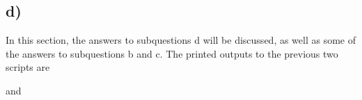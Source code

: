 \subsection*{d)}
In this section, the answers to subquestions d will be discussed, as well as some of the answers to subquestions b and c.
The printed outputs to the previous two scripts are

and

